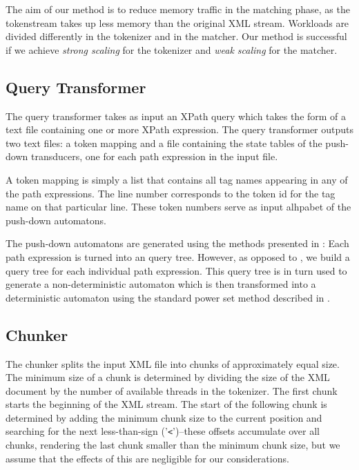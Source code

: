 The aim of our method is to reduce memory traffic in the matching phase, as the
tokenstream takes up less memory than the original XML stream. Workloads are
divided differently in the tokenizer and in the matcher. Our method is
successful if we achieve \emph{strong scaling} for the tokenizer and \emph{weak
scaling} for the matcher.

\subsection{Query Transformer}

The query transformer takes as input an XPath query which takes the form of a
text file containing one or more XPath expression. The query transformer outputs
two text files: a token mapping and a file containing the state tables of
the push-down transducers, one for each path expression in the input file.

A token mapping is simply a list that contains all tag names appearing in any
of the path expressions. The line number corresponds to the token id for the
tag name on that particular line. These token numbers serve as input alhpabet
of the push-down automatons.

The push-down automatons are generated using the methods presented in : Each path expression is turned into an query tree. However,
as opposed to , we build a query tree for each
individual path expression. This query tree is in turn used to generate a
non-deterministic automaton which is then transformed into a deterministic
automaton using the standard power set method described in .

\subsection{Chunker}

The chunker splits the input XML file into chunks of approximately equal size.
The minimum size of a chunk is determined by dividing the size of the XML
document by the number of available threads in the tokenizer. The first chunk
starts the beginning of the XML stream. The start of the following chunk is
determined by adding the minimum chunk size to the current position and
searching for the next less-than-sign ('\texttt{<}')–these offsets accumulate over
all chunks, rendering the last chunk smaller than the minimum chunk size, but we
assume that the effects of this are negligible for our considerations.

